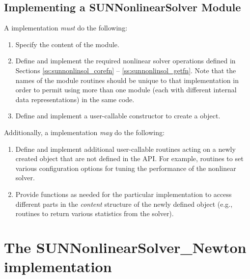 \subsection{Implementing a SUNNonlinearSolver Module}
\label{ss:sunnonlinsol_custom}

A {\sunnonlinsol} implementation \textit{must} do the following:
\begin{enumerate}
\item Specify the content of the {\sunnonlinsol} module.
\item Define and implement the required nonlinear solver operations
  defined in Sections \ref{ss:sunnonlinsol_corefn}
  -- \ref{ss:sunnonlinsol_getfn}. Note that the names of the module
  routines should be unique to that implementation in order to permit
  using more than one {\sunlinsol} module (each with different
   internal data representations) in
  the same code.
\item Define and implement a user-callable constructor to create a
   object.
\end{enumerate}
Additionally, a {\sunnonlinsol} implementation \textit{may} do the
following:
\begin{enumerate}
\item Define and implement additional user-callable routines acting on
  a newly created  object that are not defined
  in the {\sunnonlinsol} API. For example, routines to set various
  configuration options for tuning the performance of the nonlinear
  solver.
\item Provide functions as needed for the particular {\sunnonlinsol}
  implementation to access different parts in the {\em content}
  structure of the newly defined  object 
  (e.g., routines to return various statistics from the solver).
\end{enumerate}


\section{The SUNNonlinearSolver\_Newton implementation}\label{s:sunnonlinsol_newton}


